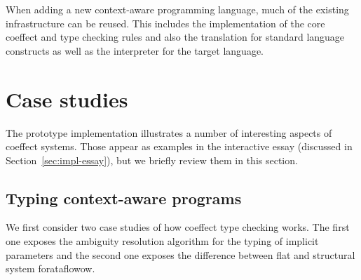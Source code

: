 When adding a new context-aware programming language, much of the existing infrastructure
can be reused. This includes the implementation of the core coeffect and type checking rules and
also the translation for standard language constructs as well as the interpreter for the target
language.


%
%

\section{Case studies}
\label{sec:impl-case}

The prototype implementation illustrates a number of interesting aspects of coeffect systems.
Those appear as examples in the interactive essay (discussed in Section~\ref{sec:impl-essay}),
but we briefly review them in this section.


\subsection{Typing context-aware programs}
\label{sec:impl-case-typing}

We first consider two case studies of how coeffect type checking works. The first one exposes the
ambiguity resolution algorithm for the typing of implicit parameters and the second one exposes the
difference between flat and structural system forataflowow.

\vspace{-0.5em}
